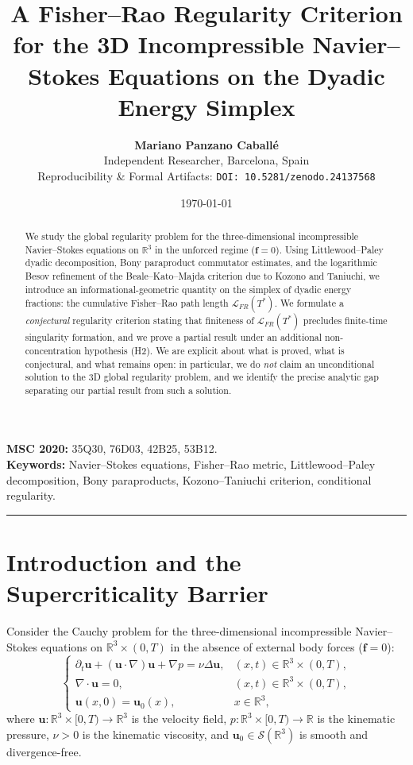 \documentclass[11pt,a4paper]{article}
\title{\textbf{A Fisher--Rao Regularity Criterion for the 3D Incompressible Navier--Stokes Equations on the Dyadic Energy Simplex}}
\author{\textbf{Mariano Panzano Caballé} \\
\small Independent Researcher, Barcelona, Spain \\
\small Reproducibility \& Formal Artifacts: \texttt{DOI: 10.5281/zenodo.24137568}}
\date{\today}
\theoremstyle{definition}
\theoremstyle{remark}
\begin{document}
\maketitle

\begin{abstract}
We study the global regularity problem for the three-dimensional incompressible Navier--Stokes equations on $\mathbb{R}^3$ in the unforced regime ($\mathbf{f}=0$). Using Littlewood--Paley dyadic decomposition, Bony paraproduct commutator estimates, and the logarithmic Besov refinement of the Beale--Kato--Majda criterion due to Kozono and Taniuchi, we introduce an informational-geometric quantity on the simplex of dyadic energy fractions: the cumulative Fisher--Rao path length $\mathcal{L}_{FR}(T^*)$. We formulate a \emph{conjectural} regularity criterion stating that finiteness of $\mathcal{L}_{FR}(T^*)$ precludes finite-time singularity formation, and we prove a partial result under an additional non-concentration hypothesis (H2). We are explicit about what is proved, what is conjectural, and what remains open: in particular, we do \emph{not} claim an unconditional solution to the 3D global regularity problem, and we identify the precise analytic gap separating our partial result from such a solution.
\end{abstract}

\noindent\textbf{MSC 2020:} 35Q30, 76D03, 42B25, 53B12. \\
\textbf{Keywords:} Navier--Stokes equations, Fisher--Rao metric, Littlewood--Paley decomposition, Bony paraproducts, Kozono--Taniuchi criterion, conditional regularity.

\vspace{3mm}
\hrule
\vspace{4mm}

\section{Introduction and the Supercriticality Barrier}

Consider the Cauchy problem for the three-dimensional incompressible Navier--Stokes equations on $\mathbb{R}^3 \times (0, T)$ in the absence of external body forces ($\mathbf{f} = 0$):
\begin{equation}
\label{eq:ns_cauchy}
\begin{cases}
\partial_t \mathbf{u} + (\mathbf{u} \cdot \nabla)\mathbf{u} + \nabla p = \nu \Delta \mathbf{u}, & (x, t) \in \mathbb{R}^3 \times (0, T), \\
\nabla \cdot \mathbf{u} = 0, & (x, t) \in \mathbb{R}^3 \times (0, T), \\
\mathbf{u}(x, 0) = \mathbf{u}_0(x), & x \in \mathbb{R}^3,
\end{cases}
\end{equation}
where $\mathbf{u}: \mathbb{R}^3 \times [0, T) \to \mathbb{R}^3$ is the velocity field, $p: \mathbb{R}^3 \times [0, T) \to \mathbb{R}$ is the kinematic pressure, $\nu > 0$ is the kinematic viscosity, and $\mathbf{u}_0 \in \mathcal{S}(\mathbb{R}^3)$ is smooth and divergence-free.
\end{document}
